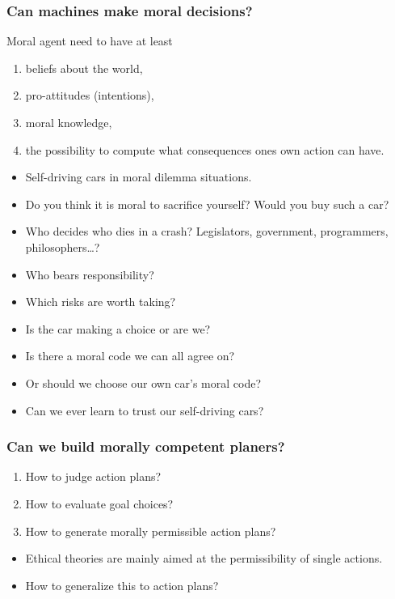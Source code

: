 \documentclass[UTF8,11pt,colorlinks,compress,openany]{beamer}%
\begin{document}
\begin{frame}\frametitle{Can machines make moral decisions?}
Moral agent need to have at least
\begin{enumerate}
	\item beliefs about the world,
	\item pro-attitudes (intentions),
	\item moral knowledge,
	\item the possibility to compute what consequences ones own action can have.
\end{enumerate}
\begin{itemize}
	\item Self-driving cars in moral dilemma situations.
	\item Do you think it is moral to sacrifice yourself? Would you buy such a car?
	\item Who decides who dies in a crash? Legislators, government, programmers, philosophers\dots?
	\item Who bears responsibility?
	\item Which risks are worth taking?
	\item Is the car making a choice or are we?
	\item Is there a moral code we can all agree on?
	\item Or should we choose our own car's moral code?
	\item Can we ever learn to trust our self-driving cars?
\end{itemize}
\end{frame}

\begin{frame}\frametitle{Can we build morally competent planers?}
\begin{enumerate}
	\item How to judge action plans?
	\item How to evaluate goal choices?
	\item How to generate morally permissible action plans?
\end{enumerate}
\begin{itemize}
\item Ethical theories are mainly aimed at the permissibility of single actions.
\item How to generalize this to action plans?
\end{itemize}
\end{frame}
\end{document}
